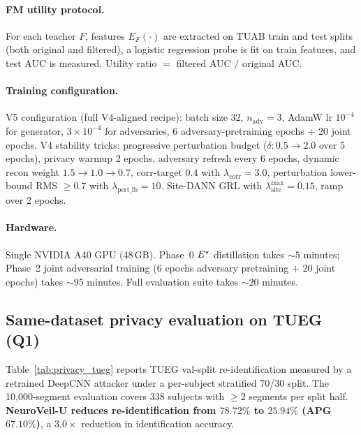 \paragraph{FM utility protocol.} For each teacher $F$, features $E_F(\cdot)$ are extracted on TUAB train and test splits (both original and filtered), a logistic regression probe is fit on train features, and test AUC is measured. Utility ratio $=$ filtered AUC $/$ original AUC.

\paragraph{Training configuration.} V5 configuration (full V4-aligned recipe): batch size 32, $n_{\text{adv}}\!=\!3$, AdamW lr $10^{-4}$ for generator, $3\!\times\!10^{-4}$ for adversaries, 6 adversary-pretraining epochs + 20 joint epochs. V4 stability tricks: progressive perturbation budget ($\delta\!:\!0.5\!\to\!2.0$ over 5 epochs), privacy warmup 2 epochs, adversary refresh every 6 epochs, dynamic recon weight $1.5\!\to\!1.0\!\to\!0.7$, corr-target $0.4$ with $\lambda_{\text{corr}}\!=\!3.0$, perturbation lower-bound RMS $\ge\!0.7$ with $\lambda_{\text{pert\_lb}}\!=\!10$. Site-DANN GRL with $\lambda_{\text{site}}^{\max}\!=\!0.15$, ramp over 2 epochs.

\paragraph{Hardware.} Single NVIDIA A40 GPU (48\,GB). Phase~0 $E^{\star}$ distillation takes $\sim\!5$ minutes; Phase~2 joint adversarial training (6 epochs adversary pretraining + 20 joint epochs) takes $\sim\!95$ minutes. Full evaluation suite takes $\sim\!20$ minutes.

\subsection{Same-dataset privacy evaluation on TUEG (Q1)}
\label{sec:q1}

Table~\ref{tab:privacy_tueg} reports TUEG val-split re-identification measured by a retrained DeepCNN attacker under a per-subject stratified 70/30 split. The 10{,}000-segment evaluation covers 338 subjects with $\ge\!2$ segments per split half. \textbf{NeuroVeil-U reduces re-identification from $78.72\%$ to $25.94\%$ (APG $67.10\%$)}, a $\mathbf{3.0\times}$ reduction in identification accuracy.

